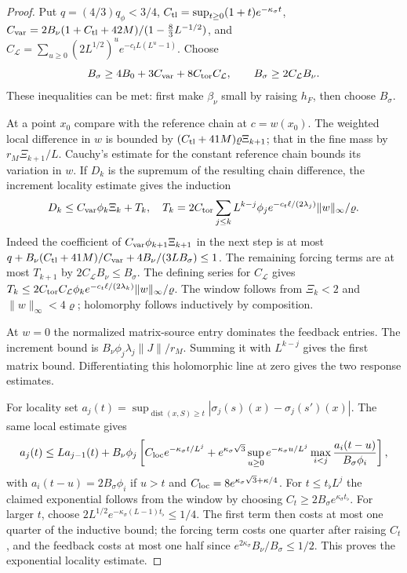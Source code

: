 \documentclass[11pt,letterpaper,reqno]{amsart}
\theoremstyle{definition}
\theoremstyle{remark}
\begin{document}
\begin{proof}
Put $q=(4/3)q_\phi<3/4$,
$C_{\rm tl}=\sup_{t\ge0}(1+t)e^{-\kappa_\sigma t}$,
$C_{\rm var}=2B_\nu(1+C_{\rm tl}+42M)/(1-\frac83L^{-1/2})$,
and $C_{\mathcal L}=\sum_{u\ge0}(2L^{1/2})^u
e^{-c_tL(L^u-1)}$.
Choose
\[
 B_\sigma\ge4B_0+3C_{\rm var}+8C_{\rm tor}C_{\mathcal L},
 \qquad B_\sigma\ge2C_{\mathcal L}B_\nu.
\]
These inequalities can be met: first make $\beta_\nu$ small
by raising $h_F$, then choose $B_\sigma$.

At a point $x_0$ compare with the reference chain at
$c=w(x_0)$. The weighted local difference in $w$ is bounded
by $(C_{\rm tl}+41M)\varrho\Xi_{k+1}$; that in the fine
mass by $r_M\Xi_{k+1}/L$. Cauchy's estimate for the constant
reference chain bounds its variation in $w$. If $D_k$
is the supremum of the resulting chain difference, the
increment locality estimate gives the induction
\[
 D_k\le C_{\rm var}\phi_k\Xi_k+T_k,\quad
 T_k=2C_{\rm tor}\sum_{j\le k}L^{k-j}\phi_j
 e^{-c_t\ell/(2\lambda_j)}\|w\|_\infty/\varrho.
\]
Indeed the coefficient of $C_{\rm var}\phi_{k+1}\Xi_{k+1}$
in the next step is at most
$q+B_\nu(C_{\rm tl}+41M)/C_{\rm var}
+4B_\nu/(3LB_\sigma)\le1$.
The remaining forcing terms are at most $T_{k+1}$ by
$2C_{\mathcal L}B_\nu\le B_\sigma$.
The defining series for $C_{\mathcal L}$ gives
$T_k\le2C_{\rm tor}C_{\mathcal L}\phi_k
e^{-c_t\ell/(2\lambda_k)}\|w\|_\infty/\varrho$.
The window follows from $\Xi_k<2$ and $\|w\|_\infty<4\varrho$;
holomorphy follows inductively by composition.

At $w=0$ the normalized matrix-source entry dominates the
feedback entries. The increment bound is
$B_\nu\phi_j\lambda_j\|J\|/r_M$.
Summing it with $L^{k-j}$ gives the first matrix bound.
Differentiating this holomorphic line at zero gives the
two response estimates.

For locality set $a_j(t)=\sup_{\operatorname{dist}(x,S)\ge t}
|\sigma_j(s)(x)-\sigma_j(s')(x)|$. The same local estimate
gives
\[
 a_j(t)\le La_{j-1}(t)+B_\nu\phi_j
 \left[C_{\rm loc}e^{-\kappa_\sigma t/L^j}
 +e^{\kappa_\sigma\sqrt3}\sup_{u\ge0}e^{-\kappa_\sigma u/L^j}
 \max_{i<j}\frac{a_i(t-u)}{B_\sigma\phi_i}\right],
\]
with $a_i(t-u)=2B_\sigma\phi_i$ if $u>t$ and
$C_{\rm loc}=8e^{\kappa_\sigma\sqrt3+\kappa/4}$.
For $t\le t_\flat L^j$ the claimed exponential follows
from the window by choosing $C_t\ge2B_\sigma
e^{\kappa_\sigma t_\flat}$. For larger $t$, choose
$2L^{1/2}e^{-\kappa_\sigma(L-1)t_\flat}\le1/4$.
The first term then costs at most one quarter of the
inductive bound; the forcing term costs one quarter after
raising $C_t$, and the feedback costs at most one half
since $e^{2\kappa_\sigma}B_\nu/B_\sigma\le1/2$.
This proves the exponential locality estimate.
\end{proof}
\end{document}
